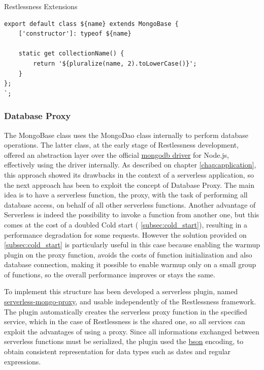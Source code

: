 \begin{chapter}{Restlessness Extensions}
\begin{lstlisting}[caption=modelTemplate function definition, label={lst:model_template}]
export default class ${name} extends MongoBase {
    ['constructor']: typeof ${name}

    static get collectionName() {
        return '${pluralize(name, 2).toLowerCase()}';
    }
};
`;
    \end{lstlisting}

    \subsubsection{Database Proxy}
    \label{subsec:database_proxy}
    The MongoBase class uses the MongoDao class internally to perform database
    operations. The latter class, at the early stage of Restlessness development,
    offered an abstraction layer over the official
    \href{https://www.npmjs.com/package/mongodb}{mongodb driver} for Node.js,
    effectively using the driver internally.
    As described on chapter \ref{chap:application}, this approach showed its
    drawbacks in the context of a serverless application, so the next approach has
    been to exploit the concept of Database Proxy.
    The main idea is to have a serverless function, the proxy, with the task of
    performing all database access, on behalf of all other serverless functions.
    Another advantage of Serverless is indeed the possibility to invoke a function
    from another one, but this comes at the cost of a doubled Cold start (
    \ref{subsec:cold_start}), resulting in a performance degradation for some requests.
    However the solution provided on \ref{subsec:cold_start} is particularly useful in
    this case because enabling the warmup plugin on the proxy function, avoids the
    costs of function initialization and also database connection, making it possible
    to enable warmup only on a small group of functions, so the overall performance
    improves or stays the same.

    To implement this structure has been developed a serverless plugin, named
    \href{https://www.npmjs.com/package/serverless-mongo-proxy}{serverless-mongo-proxy},
    and usable independently of the Restlessness framework.
    The plugin automatically creates the serverless proxy function in the specified
    service, which in the case of Restlessness is the shared one, so all services
    can exploit the advantages of using a proxy.
    Since all informations exchanged between serverless functions must be serialized,
    the plugin used the \href{http://bsonspec.org/}{bson} encoding, to obtain consistent
    representation for data types such as dates and regular expressions.


\end{chapter}
